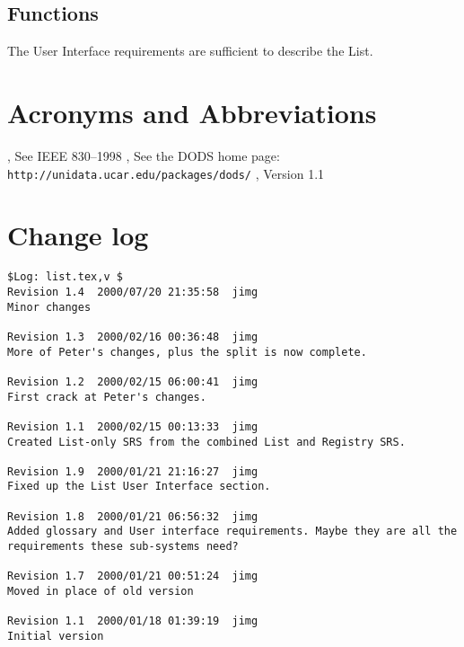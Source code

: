 \documentclass{article}
\begin{document}
\subsection{Functions}
The User Interface requirements are sufficient to describe the List.

\appendix

\section{Acronyms and Abbreviations}
\begin{acronym}
, See IEEE 830--1998
, See the DODS home page:
{\tt http://unidata.ucar.edu/packages/dods/}
, Version 1.1
\end{acronym}

\section{Change log}

\begin{verbatim}
$Log: list.tex,v $
Revision 1.4  2000/07/20 21:35:58  jimg
Minor changes

Revision 1.3  2000/02/16 00:36:48  jimg
More of Peter's changes, plus the split is now complete.

Revision 1.2  2000/02/15 06:00:41  jimg
First crack at Peter's changes.

Revision 1.1  2000/02/15 00:13:33  jimg
Created List-only SRS from the combined List and Registry SRS.

Revision 1.9  2000/01/21 21:16:27  jimg
Fixed up the List User Interface section.

Revision 1.8  2000/01/21 06:56:32  jimg
Added glossary and User interface requirements. Maybe they are all the
requirements these sub-systems need?

Revision 1.7  2000/01/21 00:51:24  jimg
Moved in place of old version

Revision 1.1  2000/01/18 01:39:19  jimg
Initial version
\end{verbatim}


\raggedright


\end{document}

